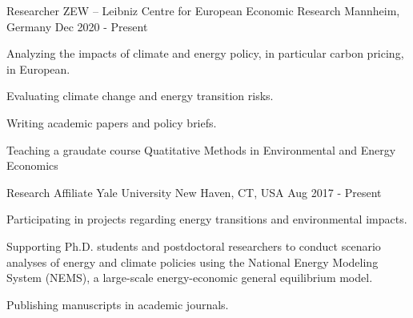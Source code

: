 

\begin{cventries}

    \cventry
    {Researcher} %
    {ZEW -- Leibniz Centre for European Economic Research} %
    {Mannheim, Germany} %
    {Dec 2020 - Present} %
    {
        \begin{cvitems} %
            \item {Analyzing the impacts of climate and energy policy, in particular carbon pricing, in European.}
            \item {Evaluating climate change and energy transition risks.}
            \item {Writing academic papers and policy briefs.}
            \item {Teaching a graudate course Quatitative Methods in Environmental and Energy Economics}
        \end{cvitems}
    }

    \cventry
    {Research Affiliate} %
    {Yale University} %
    {New Haven, CT, USA} %
    {Aug 2017 - Present} %
    {
        \begin{cvitems} %
            \item {Participating in projects regarding energy transitions and environmental impacts.}
            \item {Supporting Ph.D. students and postdoctoral researchers to conduct scenario analyses of energy and climate policies using the National Energy Modeling System (NEMS), a large-scale energy-economic general equilibrium model.}
            \item {Publishing manuscripts in academic journals.}
        \end{cvitems}
    }


\end{cventries}
